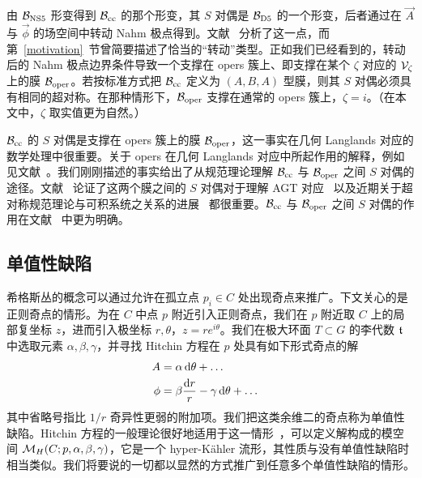 
由 $\B_\NS5$ 形变得到 $\Bcc$ 的那个形变，其 $S$ 对偶是 $\B_\uD5$ 的一个形变，后者通过在 $\vec A$ 与 $\vec \phi$ 的场空间中转动 Nahm 极点得到。文献~\cite{gw} 分析了这一点，而第~\ref{motivation}~节曾简要描述了恰当的“转动”类型。正如我们已经看到的，转动后的 Nahm 极点边界条件导致一个支撑在 opers 簇上、即支撑在某个 $\zeta$ 对应的 $\V_\zeta$ 上的膜 $\Boper$。若按标准方式把 $\Bcc$ 定义为 $(A,B,A)$ 型膜，则其 $S$ 对偶必须具有相同的超对称。在那种情形下，$\Boper$ 支撑在通常的 opers 簇上，$\zeta=i$。（在本文中，$\zeta$ 取实值更为自然。）


$\Bcc$ 的 $S$ 对偶是支撑在 opers 簇上的膜 $\Boper$，这一事实在几何 Langlands 对应的数学处理中很重要。关于 opers 在几何 Langlands 对应中所起作用的解释，例如见文献~\cite{Frenkeltwo}。我们刚刚描述的事实给出了从规范理论理解 $\Bcc$ 与 $\Boper$ 之间 $S$ 对偶的途径。文献~\cite{NW} 论证了这两个膜之间的 $S$ 对偶对于理解 AGT 对应~\cite{AGT} 以及近期关于超对称规范理论与可积系统之关系的进展~\cite{NS} 都很重要。$\Bcc$ 与 $\Boper$ 之间 $S$ 对偶的作用在文献~\cite{NStwo} 中更为明确。

\subsection{单值性缺陷}\label{mondr}

希格斯丛的概念可以通过允许在孤立点 $p_i\in C$ 处出现奇点来推广。下文关心的是正则奇点的情形。为在 $C$ 中点 $p$ 附近引入正则奇点，我们在 $p$ 附近取 $C$ 上的局部复坐标 $z$，进而引入极坐标 $r,\theta$，$z=re^{i\theta}$。我们在极大环面 $T\subset G$ 的李代数 $\frak t$ 中选取元素 $\alpha,\beta,\gamma$，并寻找 Hitchin 方程在 $p$ 处具有如下形式奇点的解
\begin{align}\label{justo}A&=\alpha\,\d\theta+\dots \cr 
\phi&=\beta\frac{\d r}{r}-\gamma\,\d\theta+\dots \end{align}
其中省略号指比 $1/r$ 奇异性更弱的附加项。我们把这类余维二的奇点称为单值性缺陷。Hitchin 方程的一般理论很好地适用于这一情形~\cite{Simpson}，可以定义解构成的模空间 $\M_H(C;p,\alpha,\beta,\gamma)$，它是一个 hyper-Kähler 流形，其性质与没有单值性缺陷时相当类似。我们将要说的一切都以显然的方式推广到任意多个单值性缺陷的情形。


